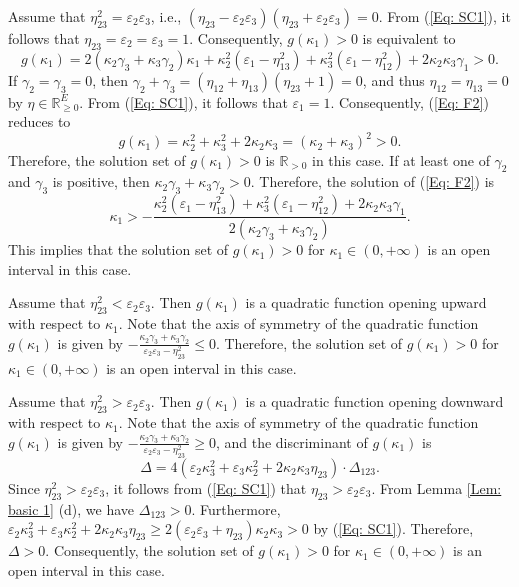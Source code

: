 \documentclass[12pt]{amsart}
\theoremstyle{definition}
\begin{document}
Assume that $\eta^2_{23}=\varepsilon_2\varepsilon_3$, i.e., $(\eta_{23}-\varepsilon_2\varepsilon_3)(\eta_{23}+\varepsilon_2\varepsilon_3)=0$. 
From (\ref{Eq: SC1}), it follows that $\eta_{23}=\varepsilon_2=\varepsilon_3=1$. Consequently, $g(\kappa_1)>0$ is equivalent to
\begin{equation}\label{Eq: F2}
g(\kappa_1)=
2(\kappa_2\gamma_{3}+\kappa_3\gamma_{2})\kappa_1
+\kappa_2^2(\varepsilon_1-\eta^2_{13})
+\kappa_3^2(\varepsilon_1-\eta^2_{12})
+2\kappa_2\kappa_3\gamma_{1}>0.
\end{equation}
If $\gamma_{2}=\gamma_{3}=0$, then $\gamma_{2}+\gamma_{3}=(\eta_{12}+\eta_{13})(\eta_{23}+1)=0$, and thus $\eta_{12}=\eta_{13}=0$ by $\eta\in \mathbb{R}^E_{\geq 0}$. From (\ref{Eq: SC1}), it follows that $\varepsilon_1=1$. Consequently, (\ref{Eq: F2}) reduces to
\begin{equation*}
g(\kappa_1)=
\kappa_2^2+\kappa_3^2+2\kappa_2\kappa_3
=(\kappa_2+\kappa_3)^2>0.
\end{equation*}
Therefore, the solution set of $g(\kappa_1)>0$ is $\mathbb{R}_{>0}$ in this case. If at least one of $\gamma_{2}$ and $\gamma_{3}$ is positive, then $\kappa_2\gamma_{3}+\kappa_3\gamma_{2}>0$. Therefore, the solution of (\ref{Eq: F2}) is
\begin{equation*}
\kappa_1>-\frac{\kappa_2^2(\varepsilon_1-\eta^2_{13})
+\kappa_3^2(\varepsilon_1-\eta^2_{12})
+2\kappa_2\kappa_3\gamma_{1}}
{2(\kappa_2\gamma_{3}+\kappa_3\gamma_{2})}.
\end{equation*}
This implies that the solution set of $g(\kappa_1)>0$ for $\kappa_1\in (0, +\infty)$ is an open interval in this case.

Assume that $\eta^2_{23}<\varepsilon_2\varepsilon_3$. Then $g(\kappa_1)$ is a quadratic function opening upward with respect to $\kappa_1$. 
Note that the axis of symmetry of the quadratic function $g(\kappa_1)$ is given by $-\frac{\kappa_2\gamma_{3}+\kappa_3\gamma_{2}}{\varepsilon_2\varepsilon_3-\eta^2_{23}}\leq0$. Therefore, the solution set of $g(\kappa_1)>0$ for $\kappa_1\in (0, +\infty)$ is an open interval in this case.

Assume that $\eta^2_{23}>\varepsilon_2\varepsilon_3$. 
Then $g(\kappa_1)$ is a quadratic function opening downward with respect to $\kappa_1$.
Note that the axis of symmetry of the quadratic function $g(\kappa_1)$ is given by $-\frac{\kappa_2\gamma_{3}+\kappa_3\gamma_{2}}{\varepsilon_2\varepsilon_3-\eta^2_{23}}\geq0$, and the discriminant of $g(\kappa_1)$ is
\begin{equation*}
\Delta=4(\varepsilon_2\kappa_3^2
+\varepsilon_3\kappa_2^2+2\kappa_2\kappa_3\eta_{23})
\cdot\Delta_{123}.
\end{equation*}
Since $\eta^2_{23}>\varepsilon_2\varepsilon_3$, 
it follows from (\ref{Eq: SC1}) that $\eta_{23}>\varepsilon_2\varepsilon_3$. 
From Lemma \ref{Lem: basic 1} (d), we have $\Delta_{123}>0$. 
Furthermore, $\varepsilon_2\kappa_3^2+\varepsilon_3\kappa_2^2+2\kappa_2\kappa_3\eta_{23}\geq 2(\varepsilon_2\varepsilon_3+\eta_{23})\kappa_2\kappa_3>0$ by (\ref{Eq: SC1}). 
Therefore, $\Delta>0$. 
Consequently, the solution set of $g(\kappa_1)>0$ for $\kappa_1\in (0, +\infty)$ is an open interval in this case.
\end{document}
